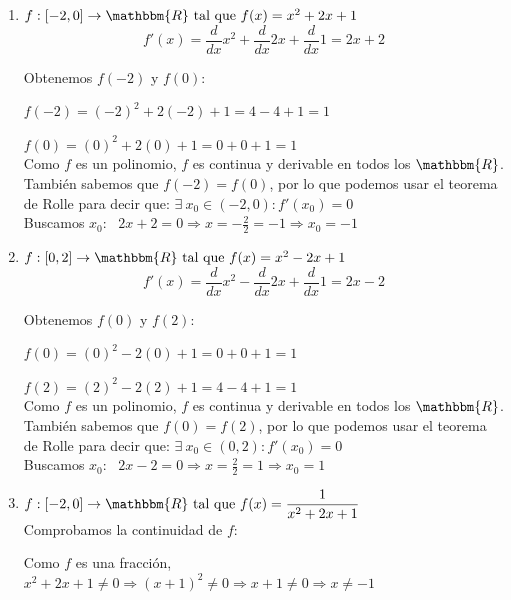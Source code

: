 \documentclass[12pt]{article}
\begin{document}
\begin{enumerate}[\hspace{9px} a)]
    \item \(f: [-2,0] \rightarrow \mathbbm{R} \ \text{tal que} \ f(x)=x^2+2x+1\)\\

        \[f'(x)=\frac{d}{dx}x^2+\frac{d}{dx}2x+\frac{d}{dx}1=2x+2\]

        Obtenemos $f(-2)$ y $f(0)$:

        \(f(-2)=(-2)^2+2(-2)+1=4-4+1=1\)

        \(f(0)=(0)^2+2(0)+1=0+0+1=1\)\\

        Como $f$ es un polinomio, $f$ es continua y derivable en todos los $\mathbbm{R}$. También sabemos que $f(-2)=f(0)$, por lo que podemos usar el teorema de Rolle para decir que: \(\exists \ x_0 \in (-2,0) : f'(x_0)=0\)\\

        Buscamos $x_0$: \ \(2x+2=0 \Rightarrow x=-\displaystyle\frac{2}{2}=-1 \Longrightarrow x_0=-1\)\\

    \item \(f: [0,2] \rightarrow \mathbbm{R} \ \text{tal que} \ f(x)=x^2-2x+1\)\\

        \[f'(x)=\frac{d}{dx}x^2-\frac{d}{dx}2x+\frac{d}{dx}1=2x-2\]

        Obtenemos $f(0)$ y $f(2)$:

        \(f(0)=(0)^2-2(0)+1=0+0+1=1\)

        \(f(2)=(2)^2-2(2)+1=4-4+1=1\)\\

        Como $f$ es un polinomio, $f$ es continua y derivable en todos los $\mathbbm{R}$. También sabemos que $f(0)=f(2)$, por lo que podemos usar el teorema de Rolle para decir que: \(\exists \ x_0 \in (0,2) : f'(x_0)=0\)\\

        Buscamos $x_0$: \ \(2x-2=0 \Rightarrow x=\displaystyle\frac{2}{2}=1 \Longrightarrow x_0=1\)\\

    \item \(f: [-2,0] \rightarrow \mathbbm{R} \ \text{tal que} \ f(x)=\displaystyle\frac{1}{x^2+2x+1}\)\\

        Comprobamos la continuidad de $f$:

        Como $f$ es una fracción, \(x^2+2x+1 \neq 0 \Rightarrow (x+1)^2 \neq 0 \Rightarrow x+1\neq0 \Rightarrow x\neq-1\)\\


\end{enumerate}
\end{document}

